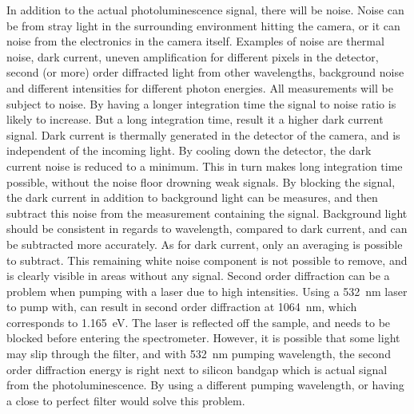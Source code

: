 In addition to the actual photoluminescence signal, there will be noise. Noise can be from stray light in the surrounding environment hitting the camera, or it can noise from the electronics in the camera itself. Examples of noise are thermal noise, dark current, uneven amplification for different pixels in the detector, second (or more) order diffracted light from other wavelengths, background noise and different intensities for different photon energies. All measurements will be subject to noise. By having a longer integration time the signal to noise ratio is likely to increase. But a long integration time, result it a higher dark current signal. Dark current is thermally generated in the detector of the camera, and is independent of the incoming light. By cooling down the detector, the dark current noise is reduced to a minimum. This in turn makes long integration time possible, without the noise floor drowning weak signals. By blocking the signal, the dark current in addition to background light can be measures, and then subtract this noise from the measurement containing the signal. Background light should be consistent in regards to wavelength, compared to dark current, and can be subtracted more accurately. As for dark current, only an averaging is possible to subtract. This remaining white noise component is not possible to remove, and is clearly visible in areas without any signal. Second order diffraction can be a problem when pumping with a laser due to high intensities. Using a 532~nm laser to pump with, can result in second order diffraction at 1064~nm, which corresponds to 1.165~eV. The laser is reflected off the sample, and needs to be blocked before entering the spectrometer. However, it is possible that some light may slip through the filter, and with 532~nm pumping wavelength, the second order diffraction energy is right next to silicon bandgap which is actual signal from the photoluminescence. By using a different pumping wavelength, or having a close to perfect filter would solve this problem.